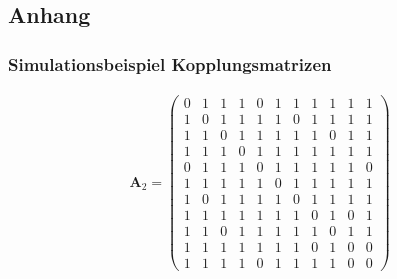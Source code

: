 \subsection*{Anhang}\label{anhang}
\subsubsection*{Simulationsbeispiel Kopplungsmatrizen}
\begin{align*}
\boldsymbol{A}_2=
\begin{pmatrix}
0 & 1 & 1 & 1 & 0 & 1 & 1 & 1 & 1 & 1 & 1 \\
1 & 0 & 1 & 1 & 1 & 1 & 0 & 1 & 1 & 1 & 1 \\
1 & 1 & 0 & 1 & 1 & 1 & 1 & 1 & 0 & 1 & 1 \\
1 & 1 & 1 & 0 & 1 & 1 & 1 & 1 & 1 & 1 & 1 \\
0 & 1 & 1 & 1 & 0 & 1 & 1 & 1 & 1 & 1 & 0 \\
1 & 1 & 1 & 1 & 1 & 0 & 1 & 1 & 1 & 1 & 1 \\
1 & 0 & 1 & 1 & 1 & 1 & 0 & 1 & 1 & 1 & 1 \\
1 & 1 & 1 & 1 & 1 & 1 & 1 & 0 & 1 & 0 & 1 \\
1 & 1 & 0 & 1 & 1 & 1 & 1 & 1 & 0 & 1 & 1 \\
1 & 1 & 1 & 1 & 1 & 1 & 1 & 0 & 1 & 0 & 0 \\
1 & 1 & 1 & 1 & 0 & 1 & 1 & 1 & 1 & 0 & 0 
\end{pmatrix}
\end{align*}
